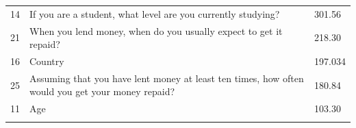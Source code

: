 \begin{longtable}[]{@{}lll@{}}
\begin{minipage}[t]{0.05\columnwidth}
14\strut
\end{minipage} & \begin{minipage}[t]{0.77\columnwidth}\raggedright
If you are a student, what level are you currently studying?\strut
\end{minipage} & \begin{minipage}[t]{0.09\columnwidth}\raggedright
301.56\strut
\end{minipage}\tabularnewline
\begin{minipage}[t]{0.05\columnwidth}\raggedright
21\strut
\end{minipage} & \begin{minipage}[t]{0.77\columnwidth}\raggedright
When you lend money, when do you usually expect to get it repaid?\strut
\end{minipage} & \begin{minipage}[t]{0.09\columnwidth}\raggedright
218.30\strut
\end{minipage}\tabularnewline
\begin{minipage}[t]{0.05\columnwidth}\raggedright
16\strut
\end{minipage} & \begin{minipage}[t]{0.77\columnwidth}\raggedright
Country\strut
\end{minipage} & \begin{minipage}[t]{0.09\columnwidth}\raggedright
197.034\strut
\end{minipage}\tabularnewline
\begin{minipage}[t]{0.05\columnwidth}\raggedright
25\strut
\end{minipage} & \begin{minipage}[t]{0.77\columnwidth}\raggedright
Assuming that you have lent money at least ten times, how often would
you get your money repaid?\strut
\end{minipage} & \begin{minipage}[t]{0.09\columnwidth}\raggedright
180.84\strut
\end{minipage}\tabularnewline
\begin{minipage}[t]{0.05\columnwidth}\raggedright
11\strut
\end{minipage} & \begin{minipage}[t]{0.77\columnwidth}\raggedright
Age\strut
\end{minipage} & \begin{minipage}[t]{0.09\columnwidth}\raggedright
103.30\strut
\end{minipage}\tabularnewline
\begin{minipage}[t]{0.05\columnwidth}\raggedright

\end{minipage}
\end{longtable}
